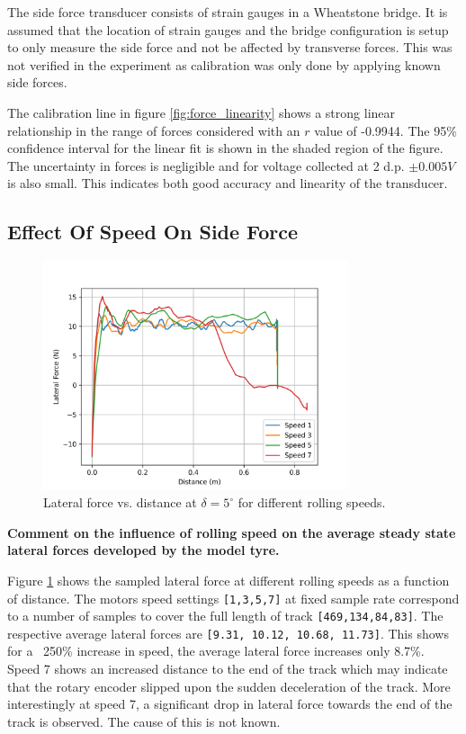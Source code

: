 \documentclass{article}
\begin{document}
The side force transducer consists of strain gauges in a Wheatstone bridge.
It is assumed that the location of strain gauges and the bridge configuration is setup to only measure the side force and not be affected by transverse forces.
This was not verified in the experiment as calibration was only done by applying known side forces.

The calibration line in figure \ref{fig:force_linearity} shows a strong linear relationship in the range of forces considered with an $r$ value of -0.9944.
The 95\% confidence interval for the linear fit is shown in the shaded region of the figure.
The uncertainty in forces is negligible and for voltage collected at 2 d.p. $\pm 0.005 V$ is also small.
This indicates both good accuracy and linearity of the transducer.

\subsection{\textbf{Effect Of Speed On Side Force}}

\begin{figure}[H]
    \centering
    \includegraphics[width=0.8\textwidth]{4.2/force_distances.png}
    \caption{Lateral force vs. distance at $\delta = 5^\circ$ for different rolling speeds.}
    \label{fig:lateral_force_distance_speed}
\end{figure}

\begin{center}
    \textbf{Comment on the influence of rolling speed on the average steady state lateral forces
    developed by the model tyre.}
\end{center}

Figure \ref{fig:lateral_force_distance_speed} shows the sampled lateral force at different rolling speeds as a function of distance.
The motors speed settings \texttt{[1,3,5,7]} at fixed sample rate correspond to a number of samples to cover the full length of track \texttt{[469,134,84,83]}.
The respective average lateral forces are \texttt{[9.31, 10.12, 10.68, 11.73]}.
This shows for a ~250\% increase in speed, the average lateral force increases only 8.7\%.
Speed 7 shows an increased distance to the end of the track which may indicate that the rotary encoder slipped upon the sudden deceleration of the track.
More interestingly at speed 7, a significant drop in lateral force towards the end of the track is observed.
The cause of this is not known.
\end{document}
